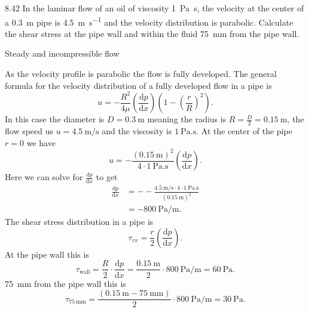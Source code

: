 
\begin{problem}{8.42}
  In the laminar flow of an oil of viscosity \qty{1}{\Pa.\s}, the velocity at the center of a \qty{0,3}{\m} pipe is \qty{4,5}{\m\per\s} and the velocity distribution is parabolic.
  Calculate the shear stress at the pipe wall and within the fluid \qty{75}{\mm} from the pipe wall.
\end{problem}

\begin{assumptions}
  \item Steady and incompressible flow
\end{assumptions}

\begin{derivation}
  As the velocity profile is parabolic the flow is fully developed.
  The general formula for the velocity distribution of a fully developed flow in a pipe is
  \[ 
  u = - \frac{R^2}{4 \mu} \left( \frac{\mathrm{d}p}{\mathrm{d}x}  \right) \left( 1 - \left( \frac{r}{R} \right)^2 \right)
  .\]
  In this case the diameter is $D = \qty{0,3}{\m}$ meaning the radius is $R = \frac{D}{2} = \qty{0,15}{\m}$, the flow speed us $u = \qty{4,5}{\m\per\s} $ and the viscosity is $\qty{1}{\Pa.\s}$.
  At the center of the pipe $r = 0$ we have
  \[ 
  u = - \frac{\left( \qty{0,15}{\m}  \right)^2}{4 \cdot \qty{1}{\Pa.\s}} \left( \frac{\mathrm{d}p}{\mathrm{d}x}  \right)
  .\]
  Here we can solve for $\frac{\mathrm{d}p}{\mathrm{d}x} $ to get
  \begin{align*}
  \frac{\mathrm{d}p}{\mathrm{d}x} &= - -\frac{\qty{4,5}{\m\per\s} \cdot 4 \cdot \qty{1}{\Pa.\s}}{\left( \qty{0,15}{\m}  \right)^2} \\
      &= \qty{-800}{\Pa\per\m}
  .\end{align*}
  The shear stress distribution in a pipe is
  \[ 
    \tau_{rx} = \frac{r}{2} \left( \frac{\mathrm{d}p}{\mathrm{d}x}  \right)
  .\]
  At the pipe wall this is
  \[ 
  \tau_{\mathrm{wall}} = \frac{R}{2} \cdot \frac{\mathrm{d}p}{\mathrm{d}x} = \frac{\qty{0,15}{\m} }{2} \cdot \qty{800}{\Pa\per\m} = \qty{60}{\Pa} 
  .\]
  \qty{75}{\mm} from the pipe wall this is
  \[ 
  \tau_{\qty{75}{\mm}} = \frac{\left( \qty{0,15}{\m} - \qty{75}{\mm} \right)}{2} \cdot \qty{800}{\Pa\per\m} = \qty{30}{\Pa} 
  .\]
\end{derivation}



